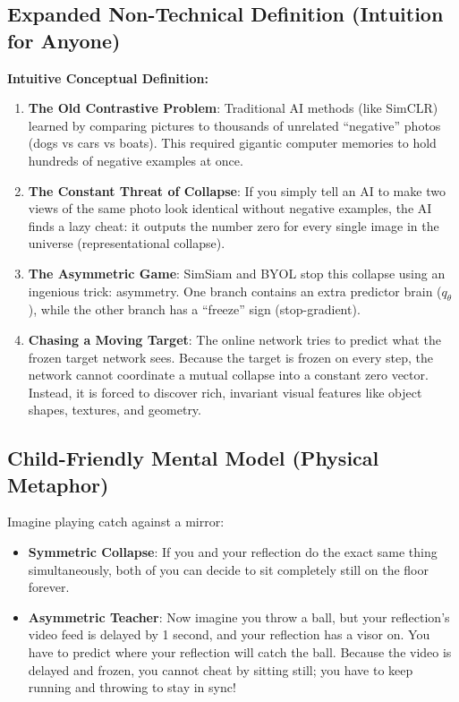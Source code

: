 \documentclass[11pt,a4paper]{article}
\theoremstyle{definition}
\begin{document}
\subsection{Expanded Non-Technical Definition (Intuition for Anyone)}
\textbf{Intuitive Conceptual Definition:}
\begin{enumerate}
    \item \textbf{The Old Contrastive Problem}: Traditional AI methods (like SimCLR) learned by comparing pictures to thousands of unrelated ``negative'' photos (dogs vs cars vs boats). This required gigantic computer memories to hold hundreds of negative examples at once.
    \item \textbf{The Constant Threat of Collapse}: If you simply tell an AI to make two views of the same photo look identical without negative examples, the AI finds a lazy cheat: it outputs the number zero for every single image in the universe (representational collapse).
    \item \textbf{The Asymmetric Game}: SimSiam and BYOL stop this collapse using an ingenious trick: asymmetry. One branch contains an extra predictor brain ($q_\theta$), while the other branch has a ``freeze'' sign (stop-gradient).
    \item \textbf{Chasing a Moving Target}: The online network tries to predict what the frozen target network sees. Because the target is frozen on every step, the network cannot coordinate a mutual collapse into a constant zero vector. Instead, it is forced to discover rich, invariant visual features like object shapes, textures, and geometry.
\end{enumerate}

\subsection{Child-Friendly Mental Model (Physical Metaphor)}
Imagine playing catch against a mirror:
\begin{itemize}
    \item \textbf{Symmetric Collapse}: If you and your reflection do the exact same thing simultaneously, both of you can decide to sit completely still on the floor forever.
    \item \textbf{Asymmetric Teacher}: Now imagine you throw a ball, but your reflection's video feed is delayed by 1 second, and your reflection has a visor on. You have to predict where your reflection will catch the ball. Because the video is delayed and frozen, you cannot cheat by sitting still; you have to keep running and throwing to stay in sync!
\end{itemize}
\end{document}
